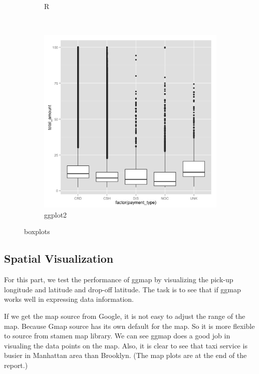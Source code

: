 \documentclass[]{article}
\begin{document}
\begin{figure}
\begin{subfigure}[b]{0.3\textwidth}
                \caption{R}
        \end{subfigure}
        ~ %
        \begin{subfigure}[b]{0.3\textwidth}
                \includegraphics[width=\textwidth]{ggplot2/boxplot.png}
                \caption{ggplot2}
        \end{subfigure}
        \caption{boxplots}
\end{figure}

\subsection{Spatial Visualization}\label{spatial-visualization}

For this part, we test the performance of ggmap by visualizing the
pick-up longitude and latitude and drop-off latitude. The task is to see
that if ggmap works well in expressing data information.

If we get the map source from Google, it is not easy to adjust the range
of the map. Because Gmap source has its own default for the map. So it
is more flexible to source from stamen map library. We can see ggmap
does a good job in visualing the data points on the map. Also, it is
clear to see that taxi service is busier in Manhattan area than
Brooklyn. (The map plots are at the end of the report.)
\end{document}
